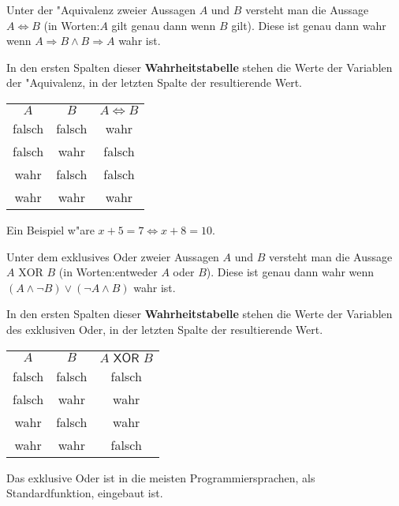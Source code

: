 \begin{definition}["Aquivalenz]
Unter der "Aquivalenz zweier Aussagen $A$ und $B$ versteht man die Aussage $A \iff B$ (in Worten:\glqq $A$ gilt genau dann wenn $B$ gilt\grqq ). Diese ist genau dann wahr wenn $A \Rightarrow B \land B \Rightarrow A$ wahr ist. 
\end{definition}
In den ersten Spalten dieser \textbf{Wahrheitstabelle} stehen die Werte der Variablen der "Aquivalenz, in der letzten Spalte der resultierende Wert.
\begin{center}
\begin{tabular}{|c|c||c|}
 $A$ & $B$ & $A \iff B$  \\ 
\cellcolor{ared}falsch & \cellcolor{ared}falsch & \cellcolor{agreen}wahr    \\ 
\cellcolor{ared}falsch & \cellcolor{agreen}wahr & \cellcolor{ared}falsch    \\ 
\cellcolor{agreen}wahr & \cellcolor{ared}falsch & \cellcolor{ared}falsch    \\ 
\cellcolor{agreen}wahr & \cellcolor{agreen}wahr & \cellcolor{agreen}wahr    \\ 
\hline
\end{tabular}
\end{center}
Ein Beispiel w"are $x + 5 = 7 \iff x + 8 = 10$.


\begin{definition}
Unter dem exklusives Oder zweier Aussagen $A$ und $B$ versteht man die Aussage $A \text{ XOR } B$ (in Worten:\glqq entweder $A$ oder $B$\grqq ). Diese ist genau dann wahr wenn $(A \land \neg B) \lor (\neg A \land B)$ wahr ist. 
\end{definition}
In den ersten Spalten dieser \textbf{Wahrheitstabelle} stehen die Werte der Variablen des exklusiven Oder, in der letzten Spalte der resultierende Wert.
\begin{center}
\begin{tabular}{|c|c||c|}
$A$ & $B$ & $A \textsf{ XOR } B$  \\ 
\cellcolor{ared}falsch &  \cellcolor{ared}falsch &  \cellcolor{ared}falsch    \\ 
\cellcolor{ared}falsch & \cellcolor{agreen}wahr & \cellcolor{agreen}wahr    \\ 
\cellcolor{agreen}wahr & \cellcolor{ared}falsch & \cellcolor{agreen}wahr    \\ 
\cellcolor{agreen}wahr & \cellcolor{agreen}wahr & \cellcolor{ared}falsch    \\ 
\hline
\end{tabular}
\end{center}
\begin{warning}
	Das exklusive Oder ist in die meisten Programmiersprachen, als Standardfunktion, eingebaut ist.
\end{warning}

